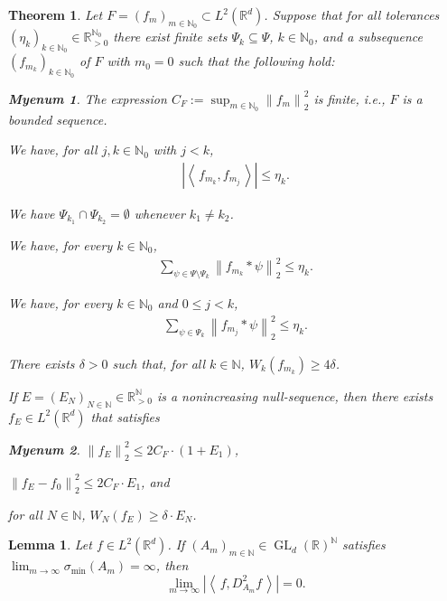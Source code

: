 \documentclass[10pt,a4paper]{amsart}
\newtheorem{theorem}{Theorem}
\newtheorem{myenum}{Myenum}
\newtheorem{lemma}{Lemma}
\DeclareMathOperator{\GL}{GL}
\newcommand{\N}{\mathbb{N}}
\newcommand{\R}{{\mathbb{R}}}
\newcommand{\ip}[1]{\ensuremath{\left<\text{} \, #1 \, \text{}\right>}}
\newcommand{\norm}[1]{\ensuremath{\left\lVert\text{}#1\text{}\right\rVert}}
\begin{document}
  \begin{theorem}\label{thm: Arbitrarily slow convergence of W_N}
    Let $F=(f_m)_{m\in \N_0} \subset L^2(\R^d)$. Suppose that for all tolerances $(\eta_k)_{k \in \N_0} \in \R_{>0}^{\N_0}$ there exist finite sets $\Psi_k\subseteq \Psi$, $k \in \N_0$, and a subsequence $(f_{m_k})_{k \in \N_0}$ of $F$ with $m_0=0$ such that the following hold:
    \begin{myenum}
      \item[(i)] The expression $C_F:=\sup_{m \in \N_0}\norm{f_m}_2^2$ is finite, i.e., $F$ is a bounded sequence.
      \item[(ii)] We have, for all $j,k \in \N_0$ with $j<k$, 
      \begin{align*}
        \left|\ip{f_{m_k},f_{m_j}}\right|\leq \eta_k.
      \end{align*}
      \item[(iii)] We have $\Psi_{k_1}\cap \Psi_{k_2}=\emptyset$ whenever $k_1\neq k_2$. 
      \item[(iv)] We have, for every $k \in \N_0$,
      \begin{align*}
        \sum_{\psi \in \Psi\setminus\Psi_k} \norm{f_{m_k}*\psi}_2^2 \leq \eta_k.
      \end{align*}  
      \item[(v)] We have, for every $k \in \N_0$ and $0\leq j < k$,
      \begin{align*}
        \sum_{\psi \in \Psi_k} \norm{f_{m_j}*\psi}_2^2 \leq \eta_k.
      \end{align*}
      \item[(vi)] There exists $\delta>0$ such that, for all $k \in \N$, $W_k(f_{m_k})\geq 4 \delta$.
    \end{myenum}
  
    If $E=(E_N)_{N \in \N}\in \R_{>0}^\N$ is a nonincreasing null-sequence, then there exists $f_E \in L^2(\R^d)$ that satisfies
    \begin{myenum}
      \item[a)] $\norm{f_E}_2^2\leq 2 C_F \cdot (1+E_1)$,
      \item[b)] $\norm{f_E-f_0}_2^2\leq 2 C_F \cdot E_1$, and
      \item[c)] for all $N\in \N$, $W_N(f_E)\geq \delta \cdot E_N$.
    \end{myenum}
  \end{theorem}

  \begin{lemma}\label{lem: ip of f and dilation of f converges to zero}
    Let $f \in L^2(\R^d)$. If $(A_m)_{m \in \N} \in \GL_d(\R)^\N$ 
    satisfies $\lim_{m \to \infty}\sigma_{\text{min}}(A_m)=\infty$, then
    \[\lim_{m \to \infty} \left|\ip{f,D_{A_m}^2f}\right|=0.\]
  \end{lemma}
\end{document}
